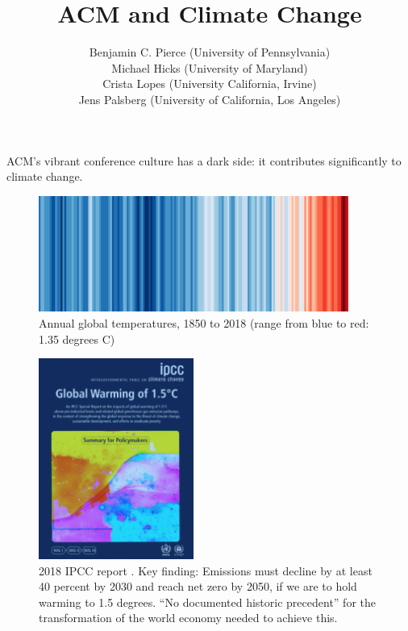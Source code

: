 \documentclass[12pt]{article}
\begin{document}
\title{\Huge ACM and Climate Change}
\author{Benjamin C. Pierce (University of Pennsylvania) \\
Michael Hicks (University of Maryland) \\
Crista Lopes (University California, Irvine) \\
Jens Palsberg (University of California, Los Angeles)}

\maketitle

ACM’s vibrant conference culture has a dark side: it contributes
significantly to climate change.

\begin{figure}[tb]
\centering
\includegraphics[width=4in]{wmo_stripes.png}
\caption{Annual global temperatures, 1850 to 2018 (range from blue to red:
  1.35 degrees C) \cite{WarmingStripes}}
\label{fig:warming}
\end{figure}

\begin{figure}[tb]
\centering
\includegraphics[width=2in]{IPCC-cover.png}
\caption{2018 IPCC report \cite{IPCC18}.  Key finding: Emissions must
  decline by at least 40 percent by 2030 and reach net zero by 2050, if we
  are to hold warming to 1.5 degrees.  ``No documented historic precedent''
  for the transformation of the world economy needed to achieve this.  }
\label{fig:warming}
\end{figure}
\end{document}
